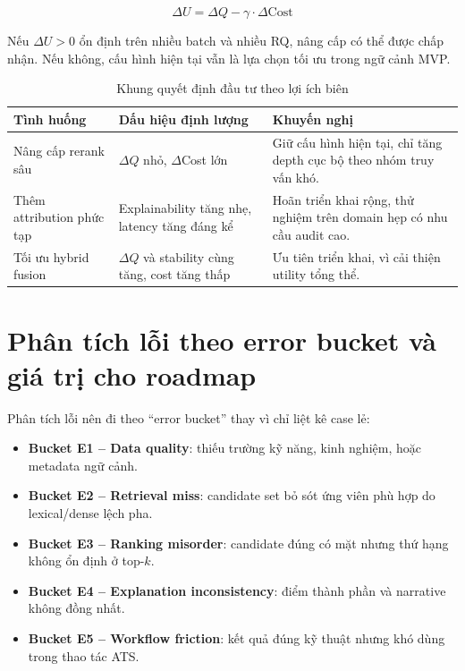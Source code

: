 \begin{equation}
\Delta U = \Delta Q - \gamma \cdot \Delta \text{Cost}
\end{equation}

Nếu $\Delta U > 0$ ổn định trên nhiều batch và nhiều RQ, nâng cấp có thể được chấp nhận. Nếu không, cấu hình hiện tại vẫn là lựa chọn tối ưu trong ngữ cảnh MVP.

\begin{table}[H]
\caption{Khung quyết định đầu tư theo lợi ích biên}
\centering
\begin{tabularx}{\textwidth}{p{}p{}X}
\toprule
\textbf{Tình huống} & \textbf{Dấu hiệu định lượng} & \textbf{Khuyến nghị}\\
\midrule
Nâng cấp rerank sâu & $\Delta Q$ nhỏ, $\Delta$Cost lớn & Giữ cấu hình hiện tại, chỉ tăng depth cục bộ theo nhóm truy vấn khó.\\
Thêm attribution phức tạp & Explainability tăng nhẹ, latency tăng đáng kể & Hoãn triển khai rộng, thử nghiệm trên domain hẹp có nhu cầu audit cao.\\
Tối ưu hybrid fusion & $\Delta Q$ và stability cùng tăng, cost tăng thấp & Ưu tiên triển khai, vì cải thiện utility tổng thể.\\
\bottomrule
\end{tabularx}
\end{table}

\section{Phân tích lỗi theo error bucket và giá trị cho roadmap}

Phân tích lỗi nên đi theo ``error bucket'' thay vì chỉ liệt kê case lẻ:

\begin{itemize}
  \item \textbf{Bucket E1 -- Data quality}: thiếu trường kỹ năng, kinh nghiệm, hoặc metadata ngữ cảnh.
  \item \textbf{Bucket E2 -- Retrieval miss}: candidate set bỏ sót ứng viên phù hợp do lexical/dense lệch pha.
  \item \textbf{Bucket E3 -- Ranking misorder}: candidate đúng có mặt nhưng thứ hạng không ổn định ở top-$k$.
  \item \textbf{Bucket E4 -- Explanation inconsistency}: điểm thành phần và narrative không đồng nhất.
  \item \textbf{Bucket E5 -- Workflow friction}: kết quả đúng kỹ thuật nhưng khó dùng trong thao tác ATS.
\end{itemize}

